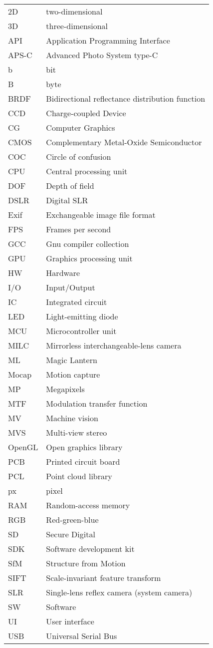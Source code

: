 \begin{tabular}{ll}
	2D & two-dimensional\\
	3D & three-dimensional\\
	API & Application Programming Interface\\
	APS-C & Advanced Photo System type-C\\
	b & bit\\
	B & byte\\
	BRDF & Bidirectional reflectance distribution function\\
	CCD & Charge-coupled Device\\
	CG & Computer Graphics\\
	CMOS & Complementary Metal-Oxide Semiconductor\\
	COC & Circle of confusion\\
	CPU & Central processing unit\\
	DOF & Depth of field\\
	DSLR & Digital SLR\\
	Exif & Exchangeable image file format\\
	FPS & Frames per second\\
	GCC & Gnu compiler collection\\
	GPU & Graphics processing unit\\
	HW & Hardware\\
	I/O & Input/Output\\
	IC & Integrated circuit\\
	LED & Light-emitting diode\\
	MCU & Microcontroller unit\\
	MILC & Mirrorless interchangeable-lens camera\\
	ML & Magic Lantern\\
	Mocap & Motion capture\\
	MP & Megapixels\\
	MTF & Modulation transfer function\\
	MV & Machine vision\\
	MVS & Multi-view stereo\\
	OpenGL & Open graphics library\\
	PCB & Printed circuit board\\
	PCL & Point cloud library\\
	px & pixel\\
	RAM & Random-access memory\\
	RGB & Red-green-blue\\
	SD & Secure Digital\\
	SDK & Software development kit\\
	SfM & Structure from Motion\\
	SIFT & Scale-invariant feature transform\\
	SLR & Single-lens reflex camera (system camera)\\
	SW & Software\\
	UI & User interface\\
	USB & Universal Serial Bus\\
\end{tabular}

